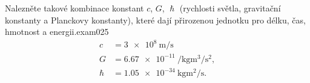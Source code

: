\begin{fyzexam}{Nalezněte takové kombinace konstant \(c\), \(G\), \(\hslash\) (rychlosti světla,
  gravitační konstanty a Planckovy konstanty), které dají přirozenou jednotku pro délku, čas,
  hmotnost a energii.}{exam025}  
    \begin{subequations}\label{fyz:eq750} 
      \begin{align}
        c       &= \SI{3e8}{\m\per\s}                              \label{fyz:eq750a}  \\
        G       &= \SI{6,67e-11}{\per\kg\cubic\m\per\square\s},    \label{fyz:eq750b}  \\
        \hslash &= \SI{1,05e-34}{\kg\square\m\per\s} .             \label{fyz:eq750c}
      \end{align}
    \end{subequations}


\end{fyzexam}
